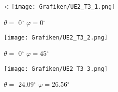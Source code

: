 \begin{Loesung}
\begin{figure}[H]
	\centering
<	\texttt{[image: Grafiken/UE2\_T3\_1.png]}
	\caption{\; \ensuremath{\theta =} 0$^{\circ}$ \; \ensuremath{\varphi = 0}$^{\circ}$ \\
}
	\label{T3_1}
\end{figure}

\begin{figure}[H]
	\centering
	\texttt{[image: Grafiken/UE2\_T3\_2.png]}
	\caption{\; \ensuremath{\theta =} 0$^{\circ}$ \; \ensuremath{\varphi = 45}$^{\circ}$ \\
}
	\label{T3_2}
\end{figure}

\begin{figure}[H]
	\centering
	\texttt{[image: Grafiken/UE2\_T3\_3.png]}
	\caption{\; \ensuremath{\theta =} 24.09$^{\circ}$ \; \ensuremath{\varphi = 26.56}$^{\circ}$ \\
}
	\label{T3_3}
\end{figure}
\end{Loesung}